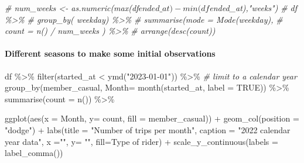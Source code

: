 \documentclass[
]{article}
\newenvironment{Shaded}{\begin{snugshade}}{\end{snugshade}}
\newcommand{\AttributeTok}[1]{\textcolor[rgb]{0.77,0.63,0.00}{#1}}
\newcommand{\CommentTok}[1]{\textcolor[rgb]{0.56,0.35,0.01}{\textit{#1}}}
\newcommand{\ConstantTok}[1]{\textcolor[rgb]{0.00,0.00,0.00}{#1}}
\newcommand{\FunctionTok}[1]{\textcolor[rgb]{0.00,0.00,0.00}{#1}}
\newcommand{\NormalTok}[1]{#1}
\newcommand{\SpecialCharTok}[1]{\textcolor[rgb]{0.00,0.00,0.00}{#1}}
\newcommand{\StringTok}[1]{\textcolor[rgb]{0.31,0.60,0.02}{#1}}
\begin{document}
\begin{Shaded}
\begin{Highlighting}[]
\CommentTok{\# num\_weeks \textless{}{-} as.numeric(max(df$ended\_at) {-} min(df$ended\_at),"weeks") }
\CommentTok{\# df \%\textgreater{}\% }
\CommentTok{\#   group\_by( weekday) \%\textgreater{}\%}
\CommentTok{\#   summarise(mode = Mode(weekday), }
\CommentTok{\#             count = n() / num\_weeks ) \%\textgreater{}\% }
\CommentTok{\#   arrange(desc(count))}
\end{Highlighting}
\end{Shaded}

\hypertarget{different-seasons-to-make-some-initial-observations}{%
\paragraph{Different seasons to make some initial
observations}\label{different-seasons-to-make-some-initial-observations}}

\begin{Shaded}
\begin{Highlighting}[]
\NormalTok{df }\SpecialCharTok{\%\textgreater{}\%} 
  \FunctionTok{filter}\NormalTok{(started\_at }\SpecialCharTok{\textless{}} \FunctionTok{ymd}\NormalTok{(}\StringTok{"2023{-}01{-}01"}\NormalTok{)) }\SpecialCharTok{\%\textgreater{}\%} \CommentTok{\# limit to a calendar year}
  \FunctionTok{group\_by}\NormalTok{(member\_casual, }\AttributeTok{Month=}  \FunctionTok{month}\NormalTok{(started\_at, }\AttributeTok{label =} \ConstantTok{TRUE}\NormalTok{)) }\SpecialCharTok{\%\textgreater{}\%}
  \FunctionTok{summarise}\NormalTok{(}\AttributeTok{count =} \FunctionTok{n}\NormalTok{()) }\SpecialCharTok{\%\textgreater{}\%}

  \FunctionTok{ggplot}\NormalTok{(}\FunctionTok{aes}\NormalTok{(}\AttributeTok{x =}\NormalTok{ Month, }\AttributeTok{y=}\NormalTok{ count, }\AttributeTok{fill =}\NormalTok{ member\_casual)) }\SpecialCharTok{+}
  \FunctionTok{geom\_col}\NormalTok{(}\AttributeTok{position =} \StringTok{"dodge"}\NormalTok{) }\SpecialCharTok{+}
  \FunctionTok{labs}\NormalTok{(}\AttributeTok{title =} \StringTok{"Number of trips per month"}\NormalTok{,}
       \AttributeTok{caption =} \StringTok{"2022 calendar year data"}\NormalTok{,}
       \AttributeTok{x =}\StringTok{""}\NormalTok{, }\AttributeTok{y=} \StringTok{""}\NormalTok{,}
       \AttributeTok{fill=}\StringTok{\textquotesingle{}Type of rider\textquotesingle{}}\NormalTok{) }\SpecialCharTok{+}
  \FunctionTok{scale\_y\_continuous}\NormalTok{(}\AttributeTok{labels =} \FunctionTok{label\_comma}\NormalTok{()) }
\end{Highlighting}
\end{Shaded}
\end{document}
